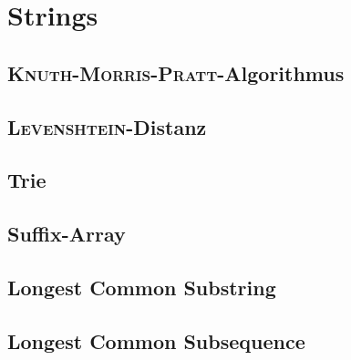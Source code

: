 \section{Strings}

\subsection{\textsc{Knuth-Morris-Pratt}-Algorithmus}


\subsection{\textsc{Levenshtein}-Distanz}


\subsection{Trie}


\subsection{Suffix-Array}


\subsection{Longest Common Substring}


\subsection{Longest Common Subsequence}

